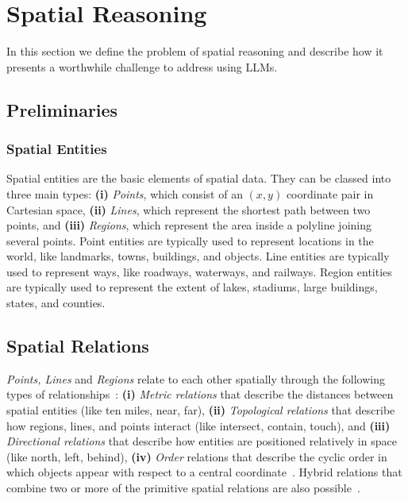 \section{Spatial Reasoning}
\label{section:background}

In this section we define the problem of spatial reasoning and describe how it presents a worthwhile challenge to address using LLMs.

\subsection{Preliminaries}



\subsubsection{Spatial Entities}
Spatial entities are the basic elements of spatial data.
They can be classed into three main types: \textbf{(i)} \textit{Points}, which consist of an $(x,y)$ coordinate pair in Cartesian space, \textbf{(ii)} \textit{Lines}, which represent the shortest path between two points, and \textbf{(iii)} \textit{Regions}, which represent the area inside a polyline joining several points. 
Point entities are typically used to represent locations in the world, like landmarks, towns, buildings, and objects.
Line entities are typically used to represent ways, like roadways, waterways, and railways.
Region entities are typically used to represent the extent of lakes, stadiums, large buildings, states, and counties.


\subsection{Spatial Relations}
\textit{Points, Lines} and \textit{Regions} relate to each other spatially through the following types of relationships~\cite{Carniel2020,Bertella2022,Carniel2023}: 
\textbf{(i)} \textit{Metric relations} that describe the distances between spatial entities (like ten miles, near, far), 
\textbf{(ii)} \textit{Topological relations} that describe how regions, lines, and points interact (like intersect, contain, touch), and 
\textbf{(iii)} \textit{Directional relations} that describe how entities are positioned relatively in space (like north, left, behind),
\textbf{(iv)} \textit{Order} relations that describe the cyclic order in which objects appear with respect to a central coordinate~\cite{Schwering2014}.
%
Hybrid relations that combine two or more of the primitive spatial relations are also possible~\cite{Carniel2023}.




